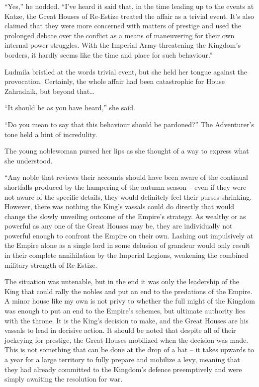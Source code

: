  

“Yes,” he nodded. “I’ve heard it said that, in the time leading up to the events at Katze, the Great Houses of Re-Estize treated the affair as a trivial event. It’s also claimed that they were more concerned with matters of prestige and used the prolonged debate over the conflict as a means of maneuvering for their own internal power struggles. With the Imperial Army threatening the Kingdom’s borders, it hardly seems like the time and place for such behaviour.”

 

Ludmila bristled at the words trivial event, but she held her tongue against the provocation. Certainly, the whole affair had been catastrophic for House Zahradnik, but beyond that…

 

“It should be as you have heard,” she said.

 

“Do you mean to say that this behaviour should be pardoned?” The Adventurer’s tone held a hint of incredulity.

 

The young noblewoman pursed her lips as she thought of a way to express what she understood.

 

“Any noble that reviews their accounts should have been aware of the continual shortfalls produced by the hampering of the autumn season – even if they were not aware of the specific details, they would definitely feel their purses shrinking. However, there was nothing the King’s vassals could do directly that would change the slowly unveiling outcome of the Empire’s strategy. As wealthy or as powerful as any one of the Great Houses may be, they are individually not powerful enough to confront the Empire on their own. Lashing out impulsively at the Empire alone as a single lord in some delusion of grandeur would only result in their complete annihilation by the Imperial Legions, weakening the combined military strength of Re-Estize.

 

The situation was untenable, but in the end it was only the leadership of the King that could rally the nobles and put an end to the predations of the Empire. A minor house like my own is not privy to whether the full might of the Kingdom was enough to put an end to the Empire’s schemes, but ultimate authority lies with the throne. It is the King’s decision to make, and the Great Houses are his vassals to lead in decisive action. It should be noted that despite all of their jockeying for prestige, the Great Houses mobilized when the decision was made. This is not something that can be done at the drop of a hat – it takes upwards to a year for a large territory to fully prepare and mobilize a levy, meaning that they had already committed to the Kingdom’s defence preemptively and were simply awaiting the resolution for war.

